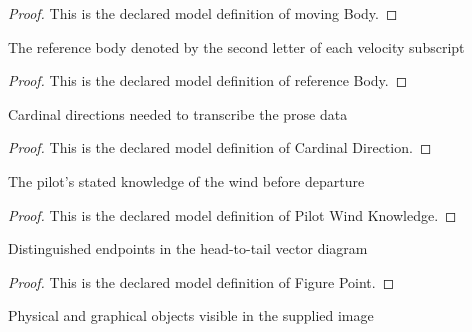 \begin{proof}
  This is the declared model definition of moving Body.
\end{proof}
\begin{definition}
  \label{def:physics:phyx-mini-0828:phyxminiproblems-problemphyxmini0828-referencebody}
  The reference body denoted by the second letter of each velocity subscript
\end{definition}
\begin{proof}
  This is the declared model definition of reference Body.
\end{proof}
\begin{definition}
  \label{def:physics:phyx-mini-0828:phyxminiproblems-problemphyxmini0828-cardinaldirection}
  Cardinal directions needed to transcribe the prose data
\end{definition}
\begin{proof}
  This is the declared model definition of Cardinal Direction.
\end{proof}
\begin{definition}
  \label{def:physics:phyx-mini-0828:phyxminiproblems-problemphyxmini0828-pilotwindknowledge}
  The pilot's stated knowledge of the wind before departure
\end{definition}
\begin{proof}
  This is the declared model definition of Pilot Wind Knowledge.
\end{proof}
\begin{definition}
  \label{def:physics:phyx-mini-0828:phyxminiproblems-problemphyxmini0828-figurepoint}
  Distinguished endpoints in the head-to-tail vector diagram
\end{definition}
\begin{proof}
  This is the declared model definition of Figure Point.
\end{proof}
\begin{definition}
  \label{def:physics:phyx-mini-0828:phyxminiproblems-problemphyxmini0828-figureobject}
  Physical and graphical objects visible in the supplied image
\end{definition}
